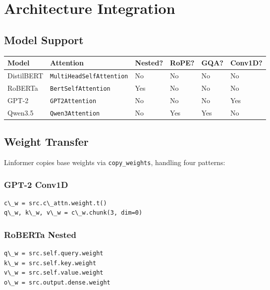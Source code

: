 \section{Architecture Integration}

\subsection{Model Support}

\begin{table}[H]
\centering
\small
\begin{tabular}{llllll}
\toprule
\textbf{Model} & \textbf{Attention} & \textbf{Nested?} & \textbf{RoPE?} & \textbf{GQA?} & \textbf{Conv1D?} \\
\midrule
DistilBERT & \texttt{MultiHeadSelfAttention} & No & No & No & No \\
RoBERTa & \texttt{BertSelfAttention} & Yes & No & No & No \\
GPT-2 & \texttt{GPT2Attention} & No & No & No & Yes \\
Qwen3.5 & \texttt{Qwen3Attention} & No & Yes & Yes & No \\
\bottomrule
\end{tabular}
\end{table}

\subsection{Weight Transfer}

Linformer copies base weights via \texttt{copy\_weights}, handling four patterns:

\subsubsection{GPT-2 Conv1D}

\begin{lstlisting}
c\_w = src.c\_attn.weight.t()
q\_w, k\_w, v\_w = c\_w.chunk(3, dim=0)
\end{lstlisting}

\subsubsection{RoBERTa Nested}

\begin{lstlisting}
q\_w = src.self.query.weight
k\_w = src.self.key.weight
v\_w = src.self.value.weight
o\_w = src.output.dense.weight
\end{lstlisting}

